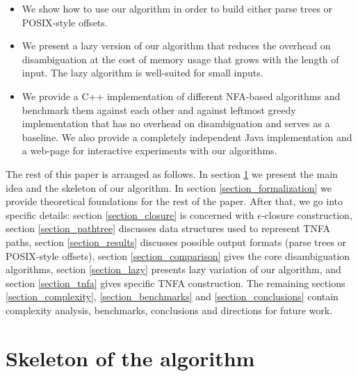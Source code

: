 \documentclass[AMA,STIX1COL]{WileyNJD-v2}
\begin{document}
\begin{itemize}[itemsep=0.5em, topsep=0.5em]
    \item We show how to use our algorithm in order to build either parse trees or POSIX-style offsets.

    \item We present a lazy version of our algorithm
        that reduces the overhead on disambiguation
        at the cost of memory usage that grows with the length of input.
        The lazy algorithm is well-suited for small inputs.

    \item We provide a C++ implementation of different NFA-based algorithms \cite{RE2C}
        and benchmark them against each other and against leftmost greedy implementation
        that has no overhead on disambiguation and serves as a baseline.
        We also provide a completely independent Java implementation
        and a web-page for interactive experiments with our algorithms.
\end{itemize}

The rest of this paper is arranged as follows.
In section \ref{section_main} we present the main idea and the skeleton of our algorithm.
In section \ref{section_formalization} we provide theoretical foundations for the rest of the paper.
After that, we go into specific details:
section \ref{section_closure} is concerned with $\epsilon$-closure construction,
section \ref{section_pathtree} discusses data structures used to represent TNFA paths,
section \ref{section_results} discusses possible output formats (parse trees or POSIX-style offsets),
section \ref{section_comparison} gives the core disambiguation algorithms,
section \ref{section_lazy} presents lazy variation of our algorithm,
and section \ref{section_tnfa} gives specific TNFA construction.
The remaining sections \ref{section_complexity}, \ref{section_benchmarks} and \ref{section_conclusions}
contain complexity analysis, benchmarks, conclusions and directions for future work.


\section{Skeleton of the algorithm}\label{section_main}
\end{document}
